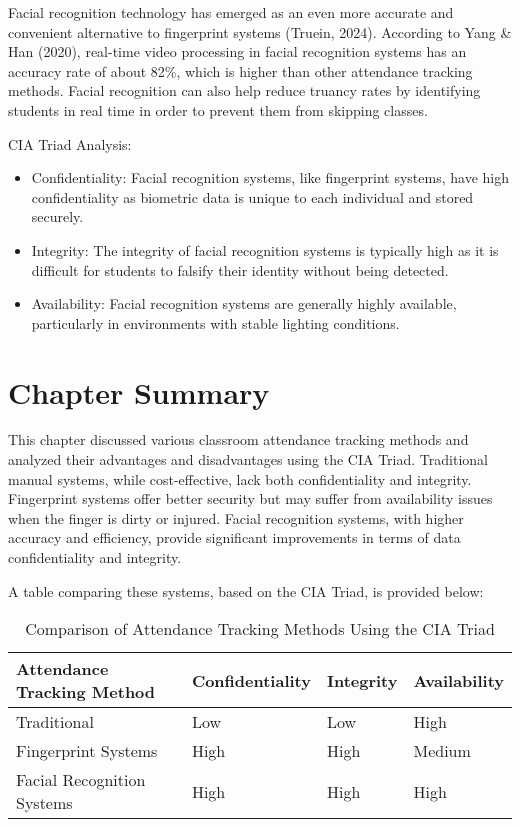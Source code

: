 Facial recognition technology has emerged as an even more accurate and convenient alternative to fingerprint systems (Truein, 2024). According to Yang \& Han (2020), real-time video processing in facial recognition systems has an accuracy rate of about 82\%, which is higher than other attendance tracking methods. Facial recognition can also help reduce truancy rates by identifying students in real time in order to prevent them from skipping classes.

CIA Triad Analysis:

\begin{itemize}
	\item Confidentiality: Facial recognition systems, like fingerprint systems, have high confidentiality as biometric data is unique to each individual and stored securely.
	\item Integrity: The integrity of facial recognition systems is typically high as it is difficult for students to falsify their identity without being detected.
	\item Availability: Facial recognition systems are generally highly available, particularly in environments with stable lighting conditions.
\end{itemize}

\section{Chapter Summary}

This chapter discussed various classroom attendance tracking methods and analyzed their advantages and disadvantages using the CIA Triad. Traditional manual systems, while cost-effective, lack both confidentiality and integrity. Fingerprint systems offer better security but may suffer from availability issues when the finger is dirty or injured. Facial recognition systems, with higher accuracy and efficiency, provide significant improvements in terms of data confidentiality and integrity.

A table comparing these systems, based on the CIA Triad, is provided below:

\begin{table}[h!]
	\centering
	\begin{tabular}{|l|l|l|l|}
		\hline
		\textbf{Attendance Tracking Method} & \textbf{Confidentiality} & \textbf{Integrity} & \textbf{Availability} \\ \hline
		Traditional & Low & Low & High \\ \hline
		Fingerprint Systems & High & High & Medium \\ \hline
		Facial Recognition Systems & High & High & High \\ \hline
	\end{tabular}
	\caption{Comparison of Attendance Tracking Methods Using the CIA Triad}
\end{table}

